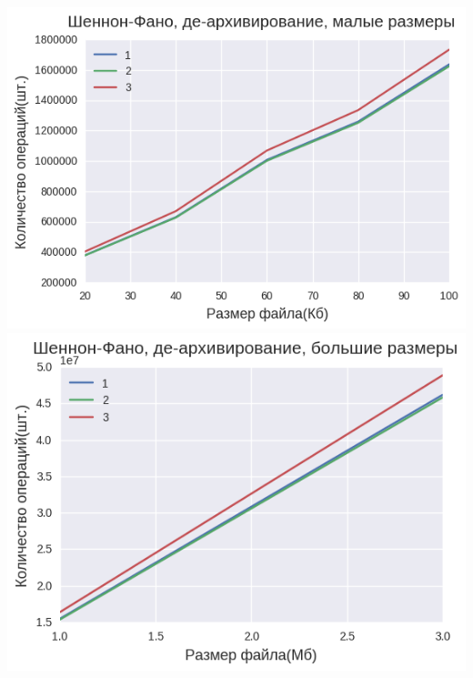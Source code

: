 \documentclass[russian, a4paper, 12pt]{article}
\begin{document}
\begin{center}
\includegraphics[width=0.9\linewidth]{./plots/1/1_2_2_1.png}\\
\includegraphics[width=0.9\linewidth]{./plots/1/1_2_2_2.png}\\
\end{center}
\end{document}
